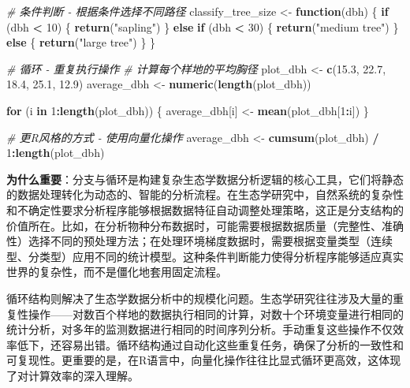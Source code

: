 \documentclass[
  twoside]{book}
\newenvironment{Shaded}{\begin{snugshade}}{\end{snugshade}}
\newcommand{\CommentTok}[1]{\textcolor[rgb]{0.56,0.35,0.01}{\textit{#1}}}
\newcommand{\ControlFlowTok}[1]{\textcolor[rgb]{0.13,0.29,0.53}{\textbf{#1}}}
\newcommand{\DecValTok}[1]{\textcolor[rgb]{0.00,0.00,0.81}{#1}}
\newcommand{\FloatTok}[1]{\textcolor[rgb]{0.00,0.00,0.81}{#1}}
\newcommand{\FunctionTok}[1]{\textcolor[rgb]{0.13,0.29,0.53}{\textbf{#1}}}
\newcommand{\NormalTok}[1]{#1}
\newcommand{\OtherTok}[1]{\textcolor[rgb]{0.56,0.35,0.01}{#1}}
\newcommand{\SpecialCharTok}[1]{\textcolor[rgb]{0.81,0.36,0.00}{\textbf{#1}}}
\newcommand{\StringTok}[1]{\textcolor[rgb]{0.31,0.60,0.02}{#1}}
\begin{document}
\begin{Shaded}
\begin{Highlighting}[]
\CommentTok{\# 条件判断 {-} 根据条件选择不同路径}
\NormalTok{classify\_tree\_size }\OtherTok{\textless{}{-}} \ControlFlowTok{function}\NormalTok{(dbh) \{}
  \ControlFlowTok{if}\NormalTok{ (dbh }\SpecialCharTok{\textless{}} \DecValTok{10}\NormalTok{) \{}
    \FunctionTok{return}\NormalTok{(}\StringTok{"sapling"}\NormalTok{)}
\NormalTok{  \} }\ControlFlowTok{else} \ControlFlowTok{if}\NormalTok{ (dbh }\SpecialCharTok{\textless{}} \DecValTok{30}\NormalTok{) \{}
    \FunctionTok{return}\NormalTok{(}\StringTok{"medium tree"}\NormalTok{)}
\NormalTok{  \} }\ControlFlowTok{else}\NormalTok{ \{}
    \FunctionTok{return}\NormalTok{(}\StringTok{"large tree"}\NormalTok{)}
\NormalTok{  \}}
\NormalTok{\}}

\CommentTok{\# 循环 {-} 重复执行操作}
\CommentTok{\# 计算每个样地的平均胸径}
\NormalTok{plot\_dbh }\OtherTok{\textless{}{-}} \FunctionTok{c}\NormalTok{(}\FloatTok{15.3}\NormalTok{, }\FloatTok{22.7}\NormalTok{, }\FloatTok{18.4}\NormalTok{, }\FloatTok{25.1}\NormalTok{, }\FloatTok{12.9}\NormalTok{)}
\NormalTok{average\_dbh }\OtherTok{\textless{}{-}} \FunctionTok{numeric}\NormalTok{(}\FunctionTok{length}\NormalTok{(plot\_dbh))}

\ControlFlowTok{for}\NormalTok{ (i }\ControlFlowTok{in} \DecValTok{1}\SpecialCharTok{:}\FunctionTok{length}\NormalTok{(plot\_dbh)) \{}
\NormalTok{  average\_dbh[i] }\OtherTok{\textless{}{-}} \FunctionTok{mean}\NormalTok{(plot\_dbh[}\DecValTok{1}\SpecialCharTok{:}\NormalTok{i])}
\NormalTok{\}}

\CommentTok{\# 更R风格的方式 {-} 使用向量化操作}
\NormalTok{average\_dbh }\OtherTok{\textless{}{-}} \FunctionTok{cumsum}\NormalTok{(plot\_dbh) }\SpecialCharTok{/} \DecValTok{1}\SpecialCharTok{:}\FunctionTok{length}\NormalTok{(plot\_dbh)}
\end{Highlighting}
\end{Shaded}

\textbf{为什么重要}：分支与循环是构建复杂生态学数据分析逻辑的核心工具，它们将静态的数据处理转化为动态的、智能的分析流程。在生态学研究中，自然系统的复杂性和不确定性要求分析程序能够根据数据特征自动调整处理策略，这正是分支结构的价值所在。比如，在分析物种分布数据时，可能需要根据数据质量（完整性、准确性）选择不同的预处理方法；在处理环境梯度数据时，需要根据变量类型（连续型、分类型）应用不同的统计模型。这种条件判断能力使得分析程序能够适应真实世界的复杂性，而不是僵化地套用固定流程。

循环结构则解决了生态学数据分析中的规模化问题。生态学研究往往涉及大量的重复性操作------对数百个样地的数据执行相同的计算，对数十个环境变量进行相同的统计分析，对多年的监测数据进行相同的时间序列分析。手动重复这些操作不仅效率低下，还容易出错。循环结构通过自动化这些重复任务，确保了分析的一致性和可复现性。更重要的是，在R语言中，向量化操作往往比显式循环更高效，这体现了对计算效率的深入理解。
\end{document}

